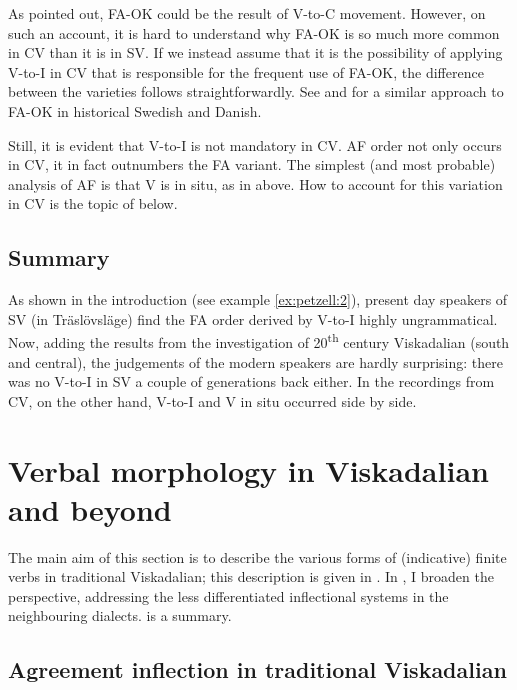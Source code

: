 \documentclass[output=paper,colorlinks,citecolor=brown,draft,draftmode]{langscibook}
\begin{document}
As pointed out, FA-OK could be the result of V-to-C movement. However, on such an account, it is hard to understand why FA-OK is so much more common in CV than it is in SV. If we instead assume that it is the possibility of applying V-to-I in CV that is responsible for the frequent use of FA-OK, the difference between the varieties follows straightforwardly. See \citet{Falk1993} and \citet{Sundquist2003} for a similar approach to FA-OK in historical Swedish and Danish. 



Still, it is evident that V-to-I is not mandatory in CV. AF order not only occurs in CV, it in fact outnumbers the FA variant. The simplest (and most probable) analysis of AF is that V is in situ, as in  above. How to account for this variation in CV is the topic of  below.


\subsection{Summary}\label{sec:petzell:2.5}\largerpage[2]


As shown in the introduction (see example \ref{ex:petzell:2}), present day speakers of SV (in Träslövsläge) find the FA order derived by V-to-I highly ungrammatical. Now, adding the results from the investigation of 20\textsuperscript{th} century Viskadalian (south and central), the judgements of the modern speakers are hardly surprising: there was no V-to-I in SV a couple of generations back either.{} In the recordings from CV, on the other hand, V-to-I and V in situ occurred side by side.


\section{Verbal morphology in Viskadalian and beyond}\label{sec:petzell:3}


The main aim of this section is to describe the various forms of (indicative) finite verbs in traditional Viskadalian; this description is given in . In , I broaden the perspective, addressing the less differentiated inflectional systems in the neighbouring dialects.  is a summary.


\subsection{Agreement inflection in traditional Viskadalian}\label{sec:petzell:3.1}
\end{document}
